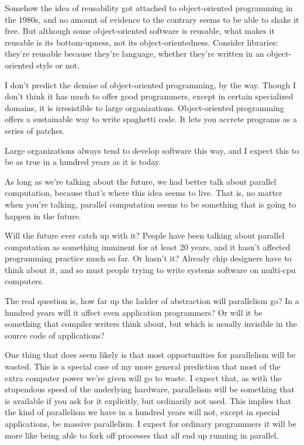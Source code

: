 Somehow the idea of reusability got attached
to object-oriented programming in the 1980s, and no amount of
evidence to the contrary seems to be able to shake it free.  But
although some object-oriented software is reusable, what makes
it reusable is its bottom-upness, not its object-orientedness.
Consider libraries: they're reusable because they're language,
whether they're written in an object-oriented style or not.

I don't predict the demise of object-oriented programming, by the
way.  Though I don't think it has much to offer good programmers,
except in certain specialized domains, it is irresistible to   
large organizations.  Object-oriented programming
offers a sustainable way to write spaghetti code.  It lets you accrete
programs as a series of patches.

Large organizations
always tend to develop software this way, and I expect this
to be as true in a hundred years as it is today.




As long as we're talking about the future, we had better
talk about parallel computation, because that's where this 
idea seems to live.  That is, no matter when you're talking, parallel
computation seems to be something that is going to happen
in the future.

Will the future ever catch up with it?  People have been
talking about parallel computation as something imminent 
for at least 20
years, and it hasn't affected programming practice much so far.
Or hasn't it?  Already
chip designers have to think about it, and so must
people trying to write systems software on multi-cpu computers.

The real question is, how far up the ladder of abstraction will
parallelism go?
In a hundred years will it affect even application programmers?  Or
will it be something that compiler writers think about, but
which is usually invisible in the source code of applications?

One thing that does seem likely is that most opportunities for
parallelism will be wasted.  This is a special case of my more   
general prediction that most of the extra computer power we're
given will go to waste.  I expect that, as with the stupendous
speed of the underlying hardware, parallelism will be something
that is available if you ask for it explicitly, but ordinarily
not used.  This implies that the kind of parallelism we have in
a hundred years will not, except in special applications, be
massive parallelism.  I expect for
ordinary programmers it will be more like being able to fork off
processes that all end up running in parallel.

